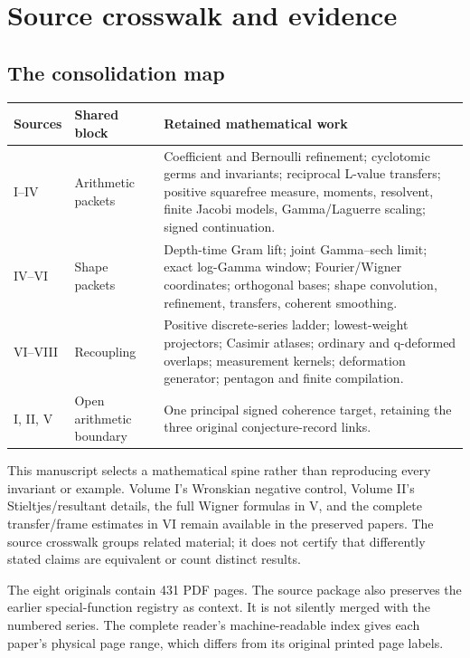 \chapter{Source crosswalk and evidence}

\section{The consolidation map}

\begin{longtable}{L{0.12\textwidth}L{0.24\textwidth}L{0.54\textwidth}}
\toprule
Sources & Shared block & Retained mathematical work\\
\midrule
\endhead
I--IV & Arithmetic packets & Coefficient and Bernoulli refinement; cyclotomic germs and invariants; reciprocal L-value transfers; positive squarefree measure, moments, resolvent, finite Jacobi models, Gamma/Laguerre scaling; signed continuation.\\
IV--VI & Shape packets & Depth-time Gram lift; joint Gamma--sech limit; exact log-Gamma window; Fourier/Wigner coordinates; orthogonal bases; shape convolution, refinement, transfers, coherent smoothing.\\
VI--VIII & Recoupling & Positive discrete-series ladder; lowest-weight projectors; Casimir atlases; ordinary and q-deformed overlaps; measurement kernels; deformation generator; pentagon and finite compilation.\\
I, II, V & Open arithmetic boundary & One principal signed coherence target, retaining the three original conjecture-record links.\\
\bottomrule
\end{longtable}

This manuscript selects a mathematical spine rather than reproducing every invariant or example. Volume I's Wronskian negative control, Volume II's Stieltjes/resultant details, the full Wigner formulas in V, and the complete transfer/frame estimates in VI remain available in the preserved papers. The source crosswalk groups related material; it does not certify that differently stated claims are equivalent or count distinct results.

The eight originals contain 431 PDF pages. The source package also preserves the earlier special-function registry as context. It is not silently merged with the numbered series. The complete reader's machine-readable index gives each paper's physical page range, which differs from its original printed page labels.

